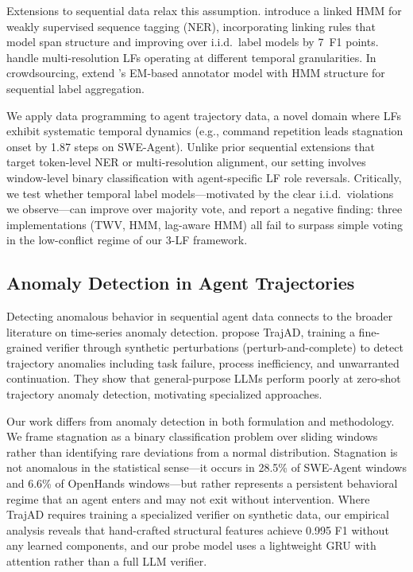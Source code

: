 Extensions to sequential data relax this assumption.
\citet{safranchik2020linkedhmm} introduce a linked HMM for weakly supervised sequence tagging (NER), incorporating linking rules that model span structure and improving over i.i.d.\ label models by 7~F1 points.
\citet{sala2019multiresolution} handle multi-resolution LFs operating at different temporal granularities.
In crowdsourcing, \citet{nguyen2017hmmcrowd} extend \citeauthor{dawid1979em}'s EM-based annotator model \citep{dawid1979em} with HMM structure for sequential label aggregation.

We apply data programming to agent trajectory data, a novel domain where LFs exhibit systematic temporal dynamics (e.g., command repetition leads stagnation onset by 1.87 steps on SWE-Agent).
Unlike prior sequential extensions that target token-level NER or multi-resolution alignment, our setting involves window-level binary classification with agent-specific LF role reversals.
Critically, we test whether temporal label models---motivated by the clear i.i.d.\ violations we observe---can improve over majority vote, and report a negative finding: three implementations (TWV, HMM, lag-aware HMM) all fail to surpass simple voting in the low-conflict regime of our 3-LF framework.

\subsection{Anomaly Detection in Agent Trajectories}

Detecting anomalous behavior in sequential agent data connects to the broader literature on time-series anomaly detection.
\citet{liu2026trajad} propose TrajAD, training a fine-grained verifier through synthetic perturbations (perturb-and-complete) to detect trajectory anomalies including task failure, process inefficiency, and unwarranted continuation.
They show that general-purpose LLMs perform poorly at zero-shot trajectory anomaly detection, motivating specialized approaches.

Our work differs from anomaly detection in both formulation and methodology.
We frame stagnation as a binary classification problem over sliding windows rather than identifying rare deviations from a normal distribution.
Stagnation is not anomalous in the statistical sense---it occurs in 28.5\% of SWE-Agent windows and 6.6\% of OpenHands windows---but rather represents a persistent behavioral regime that an agent enters and may not exit without intervention.
Where TrajAD requires training a specialized verifier on synthetic data, our empirical analysis reveals that hand-crafted structural features achieve 0.995 F1 without any learned components, and our probe model uses a lightweight GRU \citep{cho2014gru} with attention \citep{bahdanau2015attention} rather than a full LLM verifier.
